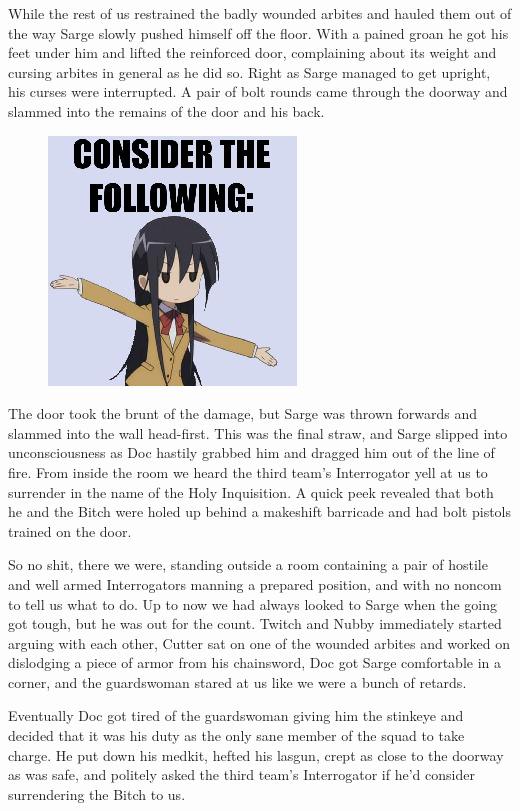 While the rest of us restrained the badly wounded arbites and hauled them out of the way Sarge slowly pushed himself off the floor. 
With a pained groan he got his feet under him and lifted the reinforced door, complaining about its weight and cursing arbites in general as he did so. 
Right as Sarge managed to get upright, his curses were interrupted. 
A pair of bolt rounds came through the doorway and slammed into the remains of the door and his back.

\begin{figure}
	\begin{center}
		\includegraphics[width=\figwidth]{pics/5/33.png}
	\end{center}
\end{figure}
The door took the brunt of the damage, but Sarge was thrown forwards and slammed into the wall head-first. 
This was the final straw, and Sarge slipped into unconsciousness as Doc hastily grabbed him and dragged him out of the line of fire. 
From inside the room we heard the third team’s Interrogator yell at us to surrender in the name of the Holy Inquisition. 
A quick peek revealed that both he and the Bitch were holed up behind a makeshift barricade and had bolt pistols trained on the door.

So no shit, there we were, standing outside a room containing a pair of hostile and well armed Interrogators manning a prepared position, and with no noncom to tell us what to do. 
Up to now we had always looked to Sarge when the going got tough, but he was out for the count. 
Twitch and Nubby immediately started arguing with each other, Cutter sat on one of the wounded arbites and worked on dislodging a piece of armor from his chainsword, Doc got Sarge comfortable in a corner, and the guardswoman stared at us like we were a bunch of retards. 

Eventually Doc got tired of the guardswoman giving him the stinkeye and decided that it was his duty as the only sane member of the squad to take charge. 
He put down his medkit, hefted his lasgun, crept as close to the doorway as was safe, and politely asked the third team’s Interrogator if he’d consider surrendering the Bitch to us.

